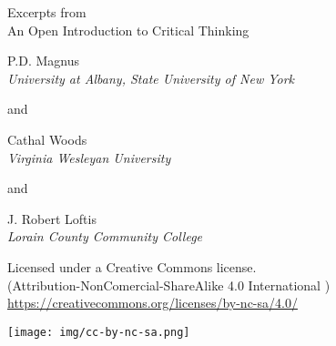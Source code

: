 \setlength{\parindent}{0em}
\thispagestyle{empty}


%


{\large Excerpts from}\\
\vfill
{\LARGE An Open Introduction to Critical Thinking}\\
\vfill 






\vfill

{\sf P.D. Magnus}\\
\emph{University at Albany, State University of New York}

and

{\sf Cathal Woods}\\
\emph{Virginia Wesleyan University}

and

{\sf J. Robert Loftis}\\
\emph{Lorain County Community College}

\vfill
%
%

{\footnotesize Licensed under a Creative Commons license.\\
	(Attribution-NonComercial-ShareAlike 4.0 International )
	\url{https://creativecommons.org/licenses/by-nc-sa/4.0/}


\texttt{[image: img/cc-by-nc-sa.png]}

}



